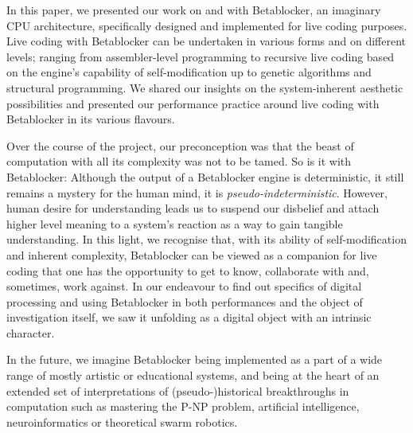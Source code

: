 \documentclass[letterpaper, 12pt]{article}
\begin{document}
In this paper, we presented our work on and with Betablocker, an imaginary CPU architecture, specifically designed and implemented for live coding purposes.
Live coding with Betablocker can be undertaken in various forms and on different levels; ranging from assembler-level programming to recursive live coding based on the engine's capability of self-modification up to genetic algorithms and structural programming.
We shared our insights on the system-inherent aesthetic possibilities and presented our performance practice around live coding with Betablocker in its various flavours.

Over the course of the project, our preconception was that the beast of computation with all its complexity was not to be tamed.
So is it with Betablocker: Although the output of a Betablocker engine is deterministic, it still remains a mystery for the human mind, it is \emph{pseudo-indeterministic}.
However, human desire for understanding leads us to suspend our disbelief and attach higher level meaning to a system's reaction as a way to gain tangible understanding.
In this light, we recognise that, with its ability of self-modification and inherent complexity, Betablocker can be viewed as a companion for live coding that one has the opportunity to get to know, collaborate with and, sometimes, work against.
In our endeavour to find out specifics of digital processing and using Betablocker in both performances and the object of investigation itself, we saw it unfolding as a digital object with an intrinsic character.

In the future, we imagine Betablocker being implemented as a part of a wide range of mostly artistic or educational systems, and being at the heart of an extended set of interpretations of (pseudo-)historical breakthroughs in computation such as mastering the P-NP problem, artificial intelligence, neuroinformatics or theoretical swarm robotics.
\parskip 18pt




% 

\end{document}
